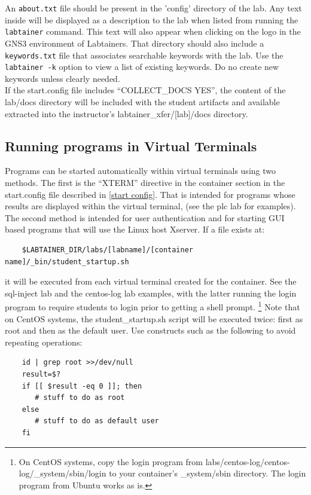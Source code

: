 \documentclass[12pt]{article}
\begin{document}
\noindent An {\tt about.txt} file should be present in the 'config' directory of the lab. Any text inside will be displayed as a description to the lab when listed from running the {\tt labtainer} command. This text will also appear when clicking on the logo in the GNS3 environment of Labtainers. That directory should also include a {\tt keywords.txt} file that associates searchable keywords with the lab.  Use
the {\tt labtainer -k} option to view a list of existing keywords.  Do no create new keywords unless clearly needed.\\ 

\noindent If the start.config file includes ``COLLECT\_DOCS YES'', the content of the lab/docs directory will be
included with the student artifacts and available extracted into the instructor's 
labtainer\_xfer/[lab]/docs directory. \\


\subsection {Running programs in Virtual Terminals}
\label {student start}
Programs can be started automatically within virtual terminals using two methods.
The first is the ``XTERM'' directive in the container section in the start.config file
described in \ref{start config}.  That is intended for programs whose results are displayed
within the virtual terminal, (see the plc lab for examples).  The second method is 
intended for user authentication and for starting GUI based programs
that will use the Linux host Xserver.  If a file exists at:
\begin{verbatim}
    $LABTAINER_DIR/labs/[labname]/[container name]/_bin/student_startup.sh
\end{verbatim}
it will be executed from each virtual terminal created for the container.
See the sql-inject lab and the centos-log lab examples, with the latter
running the login program to require students to login prior to getting a shell prompt.
\footnote{On CentOS systems, copy the login program from labs/centos-log/centos-log/\_system/sbin/login
to your container's \_system/sbin directory. The login program from Ubuntu works as is.}
Note that on CentOS systems, the student\_startup.sh script will be executed twice: first
as root and then as the default user.  Use constructs such as the following to avoid repeating
operations:
\begin{verbatim}
    id | grep root >>/dev/null
    result=$?
    if [[ $result -eq 0 ]]; then
       # stuff to do as root
    else
       # stuff to do as default user
    fi
\end{verbatim}
\end{document}
